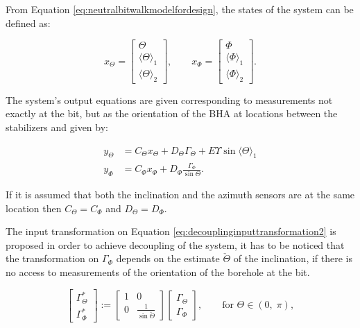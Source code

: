 \documentclass[main.tex]{subfiles}
\begin{document}
	From Equation \eqref{eq:neutralbitwalkmodelfordesign}, the states of the system can be defined as:
	
	\begin{equation}
	x_\Theta = \begin{bmatrix}
	\Theta \\
	\langle \Theta \rangle_1\\
	\langle\Theta \rangle_2 
	\end{bmatrix}, \qquad
	x_\Phi = \begin{bmatrix}
	\Phi \\
	\langle \Phi \rangle_1\\
	\langle\Phi \rangle_2 
	\end{bmatrix}.
	\end{equation}
	
	The system's output equations are given corresponding to measurements not exactly at the bit, but as the orientation of the BHA at locations between the stabilizers and given by:
	
	\begin{align}
		y_\Theta &= C_\Theta x_\Theta + D_\Theta \Gamma_\Theta + E \Upsilon \sin \langle \Theta \rangle_1 \label{eq:output1}\\
		y_\Phi &= C_\Phi x_\Phi + D_\Phi \frac{\Gamma_\Phi}{\sin \Theta}.\label{eq:output2}		
	\end{align}
	
	If it is assumed that both the inclination and the azimuth sensors are at the same location then $C_\Theta = C_\Phi$ and $D_\Theta = D_\Phi$.

	The input transformation on Equation \eqref{eq:decouplinginputtransformation2} is proposed in order to achieve decoupling of the system, it has to be noticed that the transformation on $\Gamma_\Phi$ depends on the estimate $\check{\Theta}$ of the inclination, if there is no access to measurements of the orientation of the borehole at the bit.
	
	\begin{equation}
	\begin{bmatrix}
	\Gamma_{\!\Theta}^* \\ \Gamma_{\!\Phi}^* 	
	\end{bmatrix} :=  \begin{bmatrix} 1 & 0 \\ 0 & \frac{1}{\sin \check{\Theta}}\end{bmatrix} \begin{bmatrix}\Gamma_{\!\Theta} \\ \Gamma_{\!\Phi} \end{bmatrix}, \qquad \text{for } \Theta\in (0,\; \pi),
	\label{eq:decouplinginputtransformation2}
	\end{equation}
	
\end{document}
